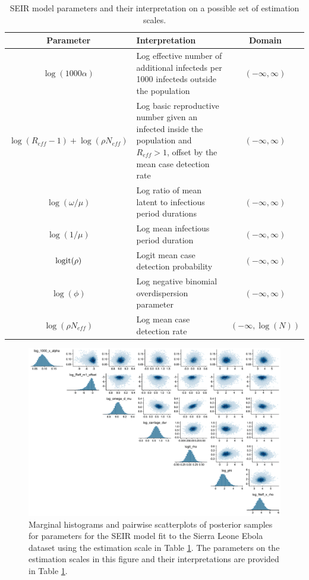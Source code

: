 \begin{table}[htbp]
	\caption{SEIR model parameters and their interpretation on a possible set of estimation scales.}
	\label{tab:seir_params_est3}
	\footnotesize
	\centering
	\begin{tabular}{clc}
		\hline
		\textbf{Parameter} & \textbf{Interpretation} & \textbf{Domain}\\
		\hline
		$\log(1000\alpha)$ & \makecell[l]{Log effective number of additional infecteds per \\ 1000 infecteds outside the population} & $(-\infty,\infty) $ \\
		$ \log(R_{eff} - 1) + \log(\rho N_{eff}) $ & \makecell[l]{Log basic reproductive number given an infected\\ inside the population and $ R_{eff} > 1 $, offset\\ by the mean case detection rate} & $(-\infty,\infty) $\\
		$ \log(\omega/\mu) $ & Log ratio of mean latent to infectious period durations & $(-\infty,\infty) $\\
		$ \log(1/\mu) $ & Log mean infectious period duration & $ (-\infty,\infty) $\\
		$ \mathrm{logit}(\rho) $ & Logit mean case detection probability & $(-\infty,\infty) $\\
		$ \log(\phi) $ & Log negative binomial overdispersion parameter & $ (-\infty,\infty) $ \\
		$ \log(\rho N_{eff}) $ & Log mean case detection rate & $(-\infty,\log(N))$\\
		\hline
	\end{tabular}
\end{table}

\begin{figure}[htbp]
	\centering
	\includegraphics[width=\linewidth]{figures/sln_pairs_t2}
	\caption[Posterior scatterplots for linear combinations of transformed Sierra Leone SEIR model parameters.]{Marginal histograms and pairwise scatterplots of posterior samples for parameters for the SEIR model fit to the Sierra Leone Ebola dataset using the estimation scale in Table \ref{tab:seir_params_est3}. The parameters on the estimation scales in this figure and their interpretations are provided in Table \ref{tab:seir_params_est3}.} 
	\label{fig:slpairs3}
\end{figure}

